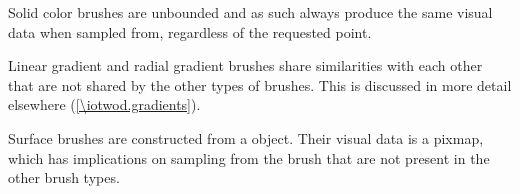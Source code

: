 %
%
%
%
%
%
\pnum
Solid color brushes are unbounded and as such always produce the same visual data when sampled from, regardless of the requested point.

\pnum
Linear gradient and radial gradient brushes share similarities with each other that are not shared by the other types of brushes. This is discussed in more detail elsewhere (\ref{\iotwod.gradients}).

\pnum
Surface brushes are constructed from a  object. Their visual data is a pixmap, which has implications on sampling from the brush that are not present in the other brush types.

\addtocounter{SectionDepthBase}{1}





%

\addtocounter{SectionDepthBase}{-1}
